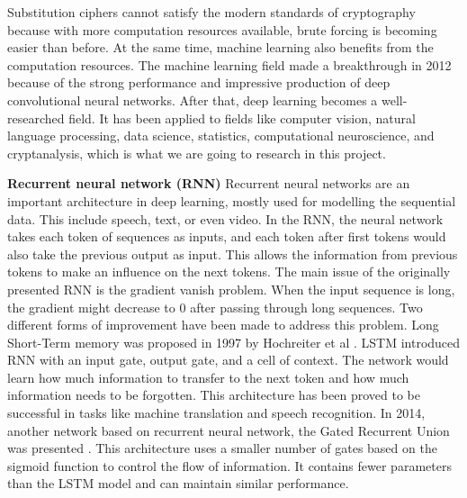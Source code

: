 Substitution ciphers cannot satisfy the modern standards of cryptography because with more computation resources available, brute forcing is becoming easier than before. At the same time, machine learning also benefits from the computation resources. The machine learning field made a breakthrough in 2012 because of the strong performance and impressive production of deep convolutional neural networks. After that, deep learning becomes a well-researched field. It has been applied to fields like computer vision, natural language processing, data science, statistics, computational neuroscience, and cryptanalysis, which is what we are going to research in this project.



\noindent\textbf{Recurrent neural network (RNN)} \qquad		Recurrent neural networks are an important architecture in deep learning, mostly used for modelling the sequential data. This include speech, text, or even video. In the RNN, the neural network takes each token of sequences as inputs, and each token after first tokens would also take the previous output as input. This allows the information from previous tokens to make an influence on the next tokens. 
The main issue of the originally presented RNN is the gradient vanish problem. When the input sequence is long, the gradient might decrease to 0 after passing through long sequences. Two different forms of improvement have been made to address this problem. Long Short-Term memory was proposed in 1997 by Hochreiter et al \cite{hochreiter1997long}. LSTM introduced RNN with an input gate, output gate, and a cell of context. The network would learn how much information to transfer to the next token and how much information needs to be forgotten. This architecture has been proved to be successful in tasks like machine translation and speech recognition. In 2014, another network based on recurrent neural network, the Gated Recurrent Union was presented \cite{chung2014empirical}. This architecture uses a smaller number of gates based on the sigmoid function to control the flow of information. It contains fewer parameters than the LSTM model and can maintain similar performance. 

